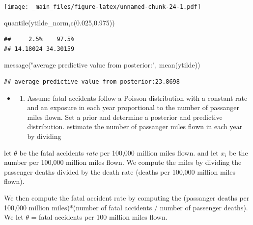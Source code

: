\documentclass[
]{book}
\newenvironment{Shaded}{\begin{snugshade}}{\end{snugshade}}
\newcommand{\FloatTok}[1]{\textcolor[rgb]{0.00,0.00,0.81}{#1}}
\newcommand{\FunctionTok}[1]{\textcolor[rgb]{0.00,0.00,0.00}{#1}}
\newcommand{\NormalTok}[1]{#1}
\newcommand{\StringTok}[1]{\textcolor[rgb]{0.31,0.60,0.02}{#1}}
\providecommand{\tightlist}{%
  \setlength{\itemsep}{0pt}\setlength{\parskip}{0pt}}
\theoremstyle{definition}
\theoremstyle{definition}
\theoremstyle{definition}
\theoremstyle{definition}
\theoremstyle{remark}
\begin{document}
\texttt{[image: \_main\_files/figure-latex/unnamed-chunk-24-1.pdf]}

\begin{Shaded}
\begin{Highlighting}[]
 \FunctionTok{quantile}\NormalTok{(ytilde\_norm,}\FunctionTok{c}\NormalTok{(}\FloatTok{0.025}\NormalTok{,}\FloatTok{0.975}\NormalTok{))}
\end{Highlighting}
\end{Shaded}

\begin{verbatim}
##     2.5%    97.5% 
## 14.18024 34.30159
\end{verbatim}

\begin{Shaded}
\begin{Highlighting}[]
 \FunctionTok{message}\NormalTok{(}\StringTok{"average predictive value from posterior:"}\NormalTok{, }\FunctionTok{mean}\NormalTok{(ytilde))}
\end{Highlighting}
\end{Shaded}

\begin{verbatim}
## average predictive value from posterior:23.8698
\end{verbatim}

\begin{itemize}
\item
  \begin{enumerate}
  \def\labelenumi{(\alph{enumi})}
  \setcounter{enumi}{1}
  \tightlist
  \item
    Assume fatal accidents follow a Poisson distribution with a constant rate and an exposure in each year proportional to the number of passanger miles flown. Set a prior and determine a posterior and predictive distribution. estimate the number of passanger miles flown in each year by dividing
  \end{enumerate}
\end{itemize}

let \(\theta\) be the fatal accidents \emph{rate} per 100,000 million miles flown. and let \(x_i\) be the number per 100,000 million miles flown. We compute the miles by dividing the passenger deaths divided by the death rate (deaths per 100,000 million miles flown).

We then compute the fatal accident rate by computing the (passanger deaths per 100,000 million miles)*(number of fatal accidents / number of passenger deaths). We let \(\theta\) = fatal accidents per 100 million miles flown.
\end{document}
